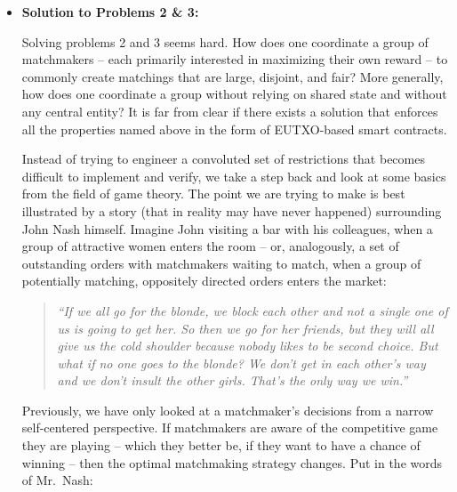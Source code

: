 \documentclass[11pt]{article}
\begin{document}
\begin{itemize}
    Hence it is unclear how to prevent matchmakers from following their individual incentive of maximizing the number of matching attempts per transaction towards maximizing the global exchange progress.\footnote{One trivial solution would of course be to only allow one matching per transaction. But as we will show, this is unnecessarily limiting and wasteful.}
    
    
    \item \textbf{Solution to Problems 2 \& 3:}
    
    Solving problems 2 and 3 seems hard. How does one coordinate a group of matchmakers -- each primarily interested in maximizing their own reward -- to commonly create matchings that are large, disjoint, and fair? More generally, how does one coordinate a group without relying on shared state and without any central entity? It is far from clear if there exists a solution that enforces all the properties named above in the form of EUTXO-based smart contracts.
    
    Instead of trying to engineer a convoluted set of restrictions that becomes difficult to implement and verify, we take a step back and look at some basics from the field of game theory. The point we are trying to make is best illustrated by a story (that in reality may have never happened) surrounding John Nash himself. Imagine John visiting a bar with his colleagues, when a group of attractive women enters the room -- or, analogously, a set of outstanding orders with matchmakers waiting to match, when a group of potentially matching, oppositely directed orders enters the market:
    
    \begin{quotation}
        \emph{``If we all go for the blonde, we block each other and not a single one of us is going to get her. So then we go for her friends, but they will all give us the cold shoulder because nobody likes to be second choice. But what if no one goes to the blonde? We don't get in each other's way and we don't insult the other girls. That's the only way we win.''}
    \end{quotation}
    
    Previously, we have only looked at a matchmaker's decisions from a narrow self-centered perspective. If matchmakers are aware of the competitive game they are playing -- which they better be, if they want to have a chance of winning -- then the optimal matchmaking strategy changes. Put in the words of Mr.\ Nash:
    

\end{itemize}
\end{document}
